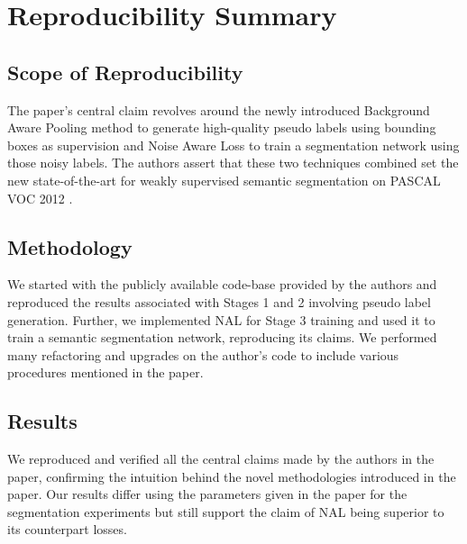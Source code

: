 \section*{Reproducibility Summary}


\subsection*{Scope of Reproducibility}

The paper's central claim revolves around the newly introduced Background Aware Pooling method to generate high-quality pseudo labels using bounding boxes as supervision and Noise Aware Loss to train a segmentation network using those noisy labels. The authors assert that these two techniques combined set the new state-of-the-art for weakly supervised semantic segmentation on PASCAL VOC 2012 \cite{pascal}. 

\subsection*{Methodology}

We started with the publicly available code-base provided by the authors and reproduced the results associated with Stages 1 and 2 involving pseudo label generation. Further, we implemented NAL for Stage 3 training and used it to train a semantic segmentation network, reproducing its claims. We performed many refactoring and upgrades on the author's code to include various procedures mentioned in the paper.

\subsection*{Results}

We reproduced and verified all the central claims made by the authors in the paper, confirming the intuition behind the novel methodologies introduced in the paper. Our results differ using the parameters given in the paper for the segmentation experiments but still support the claim of NAL being superior to its counterpart losses.

